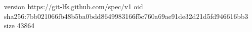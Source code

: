 version https://git-lfs.github.com/spec/v1
oid sha256:7bb021066fb48b5ba0bdd8649983166f5c760a69ae91de32d21d5fd946616bb3
size 43864
